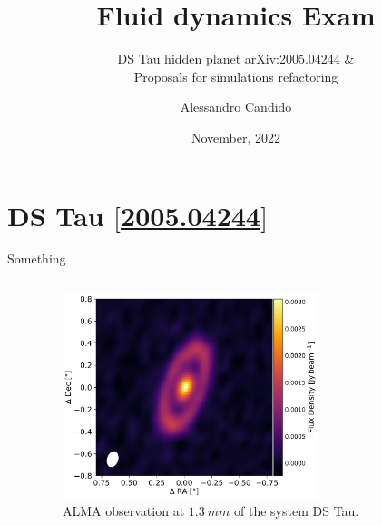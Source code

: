 \documentclass[9pt]{beamer}
\title{Fluid dynamics Exam}
\subtitle{
    DS Tau hidden planet \href{https://arxiv.org/abs/2005.04244}{arXiv:2005.04244} \&\\
    Proposals for simulations refactoring
}
\date{November, 2022}
\author{Alessandro Candido}
\providecommand{\iRef}[1]{{\color{mLightGreen}\small $[$#1$]$}}
\begin{document}
\maketitle


\section{DS Tau \iRef{\href{https://arxiv.org/abs/2005.04244}{2005.04244}}}

\begin{frame}{Something}
    \begin{columns}
        \begin{column}{0.5\textwidth}
        \end{column}
        \begin{column}{0.5\textwidth}
            \begin{figure}
                \centering
                \includegraphics[width=0.7\textwidth]{dstau_alma_13mm}
                \caption{
                    ALMA observation at $\SI{1.3}{mm}$ of the system DS Tau.
                }
            \end{figure}
        \end{column}
    \end{columns}
\end{frame}
\end{document}
